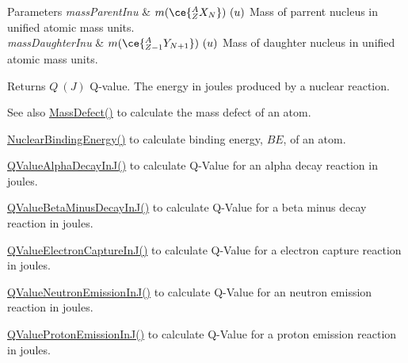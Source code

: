 \begin{DoxyParams}{Parameters}
{\em mass\+Parent\+Inu} & $m(\ce{ ^{A}_{Z}X_{N} })\ (u)$ Mass of parrent nucleus in unified atomic mass units. \\
\hline
{\em mass\+Daughter\+Inu} & $m(\ce{ ^{A}_{Z -1}Y_{N +1} })\ (u)$ Mass of daughter nucleus in unified atomic mass units. \\
\hline
\end{DoxyParams}
\begin{DoxyReturn}{Returns}
$Q\ (J)$ Q-\/value. The energy in joules produced by a nuclear reaction. 
\end{DoxyReturn}
\begin{DoxySeeAlso}{See also}
\mbox{\hyperlink{group___e_g_x_phys-_mass_defect_gae89f2dfa65992c0314adc2440b2f582a}{Mass\+Defect()}} to calculate the mass defect of an atom. 

\mbox{\hyperlink{group___e_g_x_phys-_nuclear_binding_energy_gab6832bf15ead7b4e867e759e0a2a078e}{Nuclear\+Binding\+Energy()}} to calculate binding energy, $BE$, of an atom. 

\mbox{\hyperlink{group___e_g_x_phys-_q_value-_alpha_gab8a50c18f6de3c1b6ed280c26c3ff3a5}{Q\+Value\+Alpha\+Decay\+In\+J()}} to calculate Q-\/\+Value for an alpha decay reaction in joules. 

\mbox{\hyperlink{group___e_g_x_phys-_q_value-_beta_minus_gae9a4a9f4c6e0f555e20c3144dd7329fc}{Q\+Value\+Beta\+Minus\+Decay\+In\+J()}} to calculate Q-\/\+Value for a beta minus decay reaction in joules. 

\mbox{\hyperlink{group___e_g_x_phys-_q_value-_electron_capture_gaf2569f9c706130b730dcf55695780263}{Q\+Value\+Electron\+Capture\+In\+J()}} to calculate Q-\/\+Value for a electron capture reaction in joules. 

\mbox{\hyperlink{group___e_g_x_phys-_q_value-_neutron_emission_gacb17fa06731637937bc65765943d67ca}{Q\+Value\+Neutron\+Emission\+In\+J()}} to calculate Q-\/\+Value for an neutron emission reaction in joules. 

\mbox{\hyperlink{group___e_g_x_phys-_q_value-_proton_emission_ga41f19b0d9a2dc06e89de44aaa2d48d62}{Q\+Value\+Proton\+Emission\+In\+J()}} to calculate Q-\/\+Value for a proton emission reaction in joules. 
\end{DoxySeeAlso}
\mbox{\label{group___e_g_x_phys-_q_value-_beta_plus_ga3c4f7ec8e7c44d01d3aee6447a5ab443}} 
